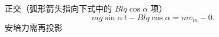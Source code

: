 \begin{problem}[4]

\begin{solution}
正交（弧形箭头指向下式中的 $Blq\cos\alpha$ 项）
\[
mg\sin\alpha\, t-Blq\cos\alpha=mv_m-0.
\]
安培力需再投影
\end{solution}
\end{problem}
